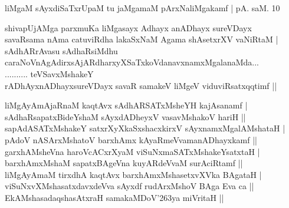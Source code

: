 \begin{entry}
\begin{shl}
\end{shl}
\gl{}
\begin{shl}
liMgaM sAyxdiSaTxrUpaM tu jaMgamaM pArxNaliMgakamf | pA. saM. 10
\end{shl}
\gl{}
\info{}{}{}{}
\begin{shl}
shivapUjAMga parxmuKa liMgasayx Adhayx anADhayx sureVDayx\\
savaRsama nAma catuviRdha lakaSxNaM Agama shAsetxrXV vaNiRtaM |\\
sAdhARrAvasu sAdhaRsiMdhu caraNoVnAgAdirxsAjARdharxyXSaTxkoVdanavxnamxMgalanaMda...\\
.......... teVSavxMshakeY\\
rADhAyxnADhayxsureVDayx savaR samakeV liMgeV viduviRsatxqqtimf ||
\end{shl}
\begin{shl}
liMgAyAmAjaRnaM kaqtAvx sAdhARSATxMsheYH kajAsanamf |\\
sAdhaRsapatxBideYshaM sAyxdADheyxV vasavMshakoV hariH ||\\
sapAdASATxMshakeY satxrXyXkaSxshacxkirxV sAyxnamxMgalAMshataH |\\
pAdoV nASArxMshatoV barxhAmx kAyaRmeVvamanADhayxkamf ||\\
garxhAMsheVna haroVcACxrXyaM viSuNxmaSATxMshakeYsatxtaH |\\
barxhAmxMshaM sapatxBAgeVna kuyARdeVvaM surAciRtamf ||\\
liMgAyAmaM tirxdhA kaqtAvx barxhAmxMshasetxvXVka BAgataH |\\
viSuNxvXMshasatxdavxdeVva sAyxdf rudArxMshoV BAga Eva ca ||\\
EkAMshasadaqshasAtxraH samakaMDoV\char'263ya miVritaH ||
\end{shl}
\end{entry}


